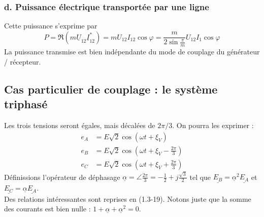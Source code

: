 		
\subsubsection{d. Puissance électrique transportée par une ligne}
Cette puissance s'exprime par 
\begin{equation}
	P = \Re(m\underline{U}_{12}\underline{I}_{12}^*) = mU_{12}I_{12}\cos
	\varphi = \frac{m}{2\sin\frac{\pi}{m}}U_{12}I_1\cos\varphi
\end{equation}
La puissance transmise est bien indépendante du mode de couplage du 
générateur / récepteur.
		
\subsection{Cas particulier de couplage : le système triphasé}
Les trois tensions seront égales, mais décalées de $2\pi/3$. On pourra 
les exprimer :
\begin{equation}
	\begin{array}{ll}
		e_A & = E\sqrt{2}\cos(\omega t +\xi_V)                  \\
		e_B & = E\sqrt{2}\cos(\omega t +\xi_V - \frac{2\pi}{3}) \\
		e_C & = E\sqrt{2}\cos(\omega t +\xi_V + \frac{2\pi}{3}) 
	\end{array}
\end{equation}
Définissions l'opérateur de déphasage $\underline{\alpha} = \angle \frac{2
	\pi}{3} = -\frac{1}{2}+j\frac{\sqrt{3}}{2}$ tel que $\underline{E_B} = 
\underline{\alpha}^2\underline{E_A}$ et $\underline{E_C} = \underline{\alpha}
\underline{E_A}$.\\
Des relations intéressantes sont reprises en (1.3-19). Notons juste que 
la somme des courants est bien nulle : $1+\underline{\alpha}+\underline{
	\alpha}^2 = 0$.
		
